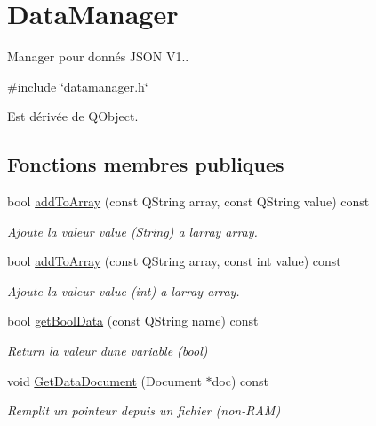 \hypertarget{classDataManager}{}\section{Data\+Manager}
\label{classDataManager}


Manager pour donnés J\+S\+ON V1..  




{\ttfamily \#include \char`\"{}datamanager.\+h\char`\"{}}



Est dérivée de Q\+Object.

\subsection*{Fonctions membres publiques}
\begin{DoxyCompactItemize}
\item 
bool \hyperlink{classDataManager_a45a34311e5a2d6d192293eaeaff22a6e}{add\+To\+Array} (const Q\+String array, const Q\+String value) const
\begin{DoxyCompactList}\small\item\em Ajoute la valeur value (String) a l\textquotesingle{}array array. \end{DoxyCompactList}\item 
bool \hyperlink{classDataManager_ae853a46801f77c83528be95b19cf271b}{add\+To\+Array} (const Q\+String array, const int value) const
\begin{DoxyCompactList}\small\item\em Ajoute la valeur value (int) a l\textquotesingle{}array array. \end{DoxyCompactList}\item 
bool \hyperlink{classDataManager_a70a1a322edd474e7df74ce2f06d8722d}{get\+Bool\+Data} (const Q\+String name) const
\begin{DoxyCompactList}\small\item\em Return la valeur d\textquotesingle{}une variable (bool) \end{DoxyCompactList}\item 
void \hyperlink{classDataManager_a0539555de38fb7fbfa170007a0cb3ae3}{Get\+Data\+Document} (Document $\ast$doc) const
\begin{DoxyCompactList}\small\item\em Remplit un pointeur depuis un fichier (non-\/\+R\+AM) \end{DoxyCompactList}\item 

\end{DoxyCompactItemize}
